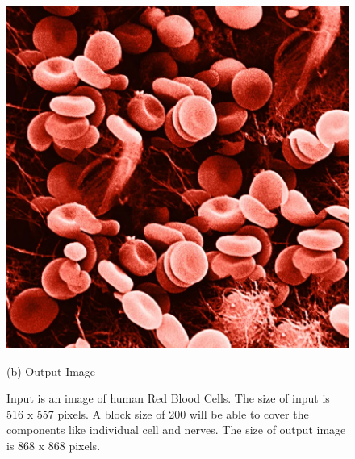 \documentclass[12pt,a4paper]{report}
\begin{document}
\begin{figure}[H]
  \includegraphics[scale=0.25]{pics/rbc_cut.png}
    \caption{(b) Output Image}
  \endminipage
  \caption*{Input is an image of human Red Blood Cells. The size of input is 516 x 557 pixels. A block size of 200 will be able to cover the components like individual cell and nerves. The size of output image is 868 x 868 pixels.}
  
\end{figure}
\end{document}
